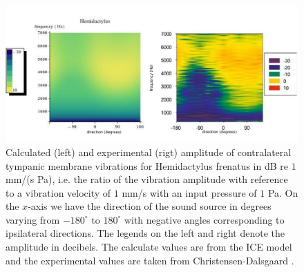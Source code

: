 \begin{figure}[ht]
 \centering
 \includegraphics[width=1.0\linewidth]{Diagrams/Plots/hemidactylusvibampfull.png}
 \caption[Vibration amplitude for the common house gecko]{Calculated (left) and experimental (rigt) amplitude of contralateral tympanic membrane vibrations for Hemidactylus frenatus
 in dB re $1$ mm/(s Pa), i.e. the ratio of the vibration amplitude with reference to a vibration velocity of $1$ mm/s with an input pressure of $1$ Pa. On the $x$-axis we have
 the direction of the sound source in degrees varying from $-180^\circ\mbox{ to }180^\circ$ with negative angles corresponding to ipsilateral directions. The legends on the left and
 right denote the amplitude in decibels. The calculate values are from the ICE model and the experimental values are taken from Christensen-Dalsgaard \cite{dalsgaardmanley2}.}
  \label{hemidactylusvibampfull}
\end{figure}

